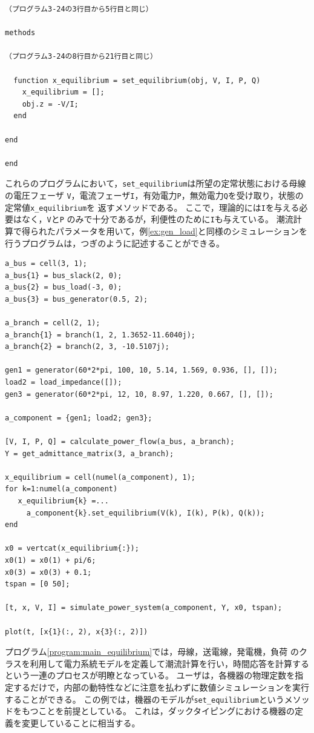 \documentclass[tombow,dvipdfmx]{corona-a5-1.1}
\begin{document}
\begin{例}[発電機や負荷の定常状態を計算するメソッドの追加]
\begin{PROGRAMA}[count,title={load\_impedance.m}]
\begin{verbatim}
（プログラム3-24の3行目から5行目と同じ）

methods
  
（プログラム3-24の8行目から21行目と同じ）

  function x_equilibrium = set_equilibrium(obj, V, I, P, Q)
    x_equilibrium = [];
    obj.z = -V/I;
  end

end

end
\end{verbatim}
\end{PROGRAMA}
これらのプログラムにおいて，\verb|set_equilibrium|は所望の定常状態における母線の電圧フェーザ
\verb|V|，電流フェーザ\verb|I|，有効電力\verb|P|，無効電力\verb|Q|を受け取り，状態の定常値\verb|x_equilibrium|を
返すメソッドである。
ここで，理論的には\verb|I|を与える必要はなく，\verb|V|と\verb|P|
のみで十分であるが，利便性のために\verb|I|も与えている。
潮流計算で得られたパラメータを用いて，例\ref{ex:gen_load}と同様のシミュレーションを行うプログラムは，つぎのように記述することができる。

\smallskip
\begin{PROGRAMA}[count,title={main\_simulation\_3bus\_equilibrium.m}]\label{program:main_equilibrium}
\begin{verbatim}
a_bus = cell(3, 1);
a_bus{1} = bus_slack(2, 0);
a_bus{2} = bus_load(-3, 0);
a_bus{3} = bus_generator(0.5, 2);

a_branch = cell(2, 1);
a_branch{1} = branch(1, 2, 1.3652-11.6040j);
a_branch{2} = branch(2, 3, -10.5107j);

gen1 = generator(60*2*pi, 100, 10, 5.14, 1.569, 0.936, [], []);
load2 = load_impedance([]);
gen3 = generator(60*2*pi, 12, 10, 8.97, 1.220, 0.667, [], []);

a_component = {gen1; load2; gen3};

[V, I, P, Q] = calculate_power_flow(a_bus, a_branch);
Y = get_admittance_matrix(3, a_branch);

x_equilibrium = cell(numel(a_component), 1);
for k=1:numel(a_component)
   x_equilibrium{k} =...
     a_component{k}.set_equilibrium(V(k), I(k), P(k), Q(k)); 
end

x0 = vertcat(x_equilibrium{:});
x0(1) = x0(1) + pi/6;
x0(3) = x0(3) + 0.1;
tspan = [0 50];

[t, x, V, I] = simulate_power_system(a_component, Y, x0, tspan);

plot(t, [x{1}(:, 2), x{3}(:, 2)])
\end{verbatim}
\end{PROGRAMA}

プログラム\ref{program:main_equilibrium}では，母線，送電線，発電機，負荷
のクラスを利用して電力系統モデルを定義して潮流計算を行い，時間応答を計算するという一連のプロセスが明瞭となっている。
ユーザは，各機器の物理定数を指定するだけで，内部の動特性などに注意を払わずに数値シミュレーションを実行することができる。
この例では，機器のモデルが\verb|set_equilibrium|というメソッドをもつことを前提としている。
これは，ダックタイピングにおける機器の定義を変更していることに相当する。
\end{例}
\end{document}
